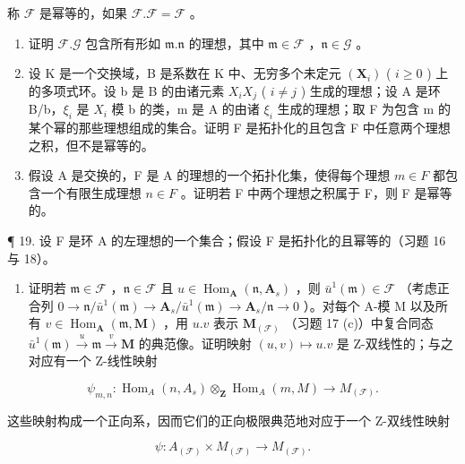 称 \(\mathcal{F}\) 是幂等的，如果 \(\mathcal{F}.\mathcal{F} = \mathcal{F}\) 。

\begin{enumerate}
\def\labelenumi{(\alph{enumi})}
\setcounter{enumi}{1}
\item
  证明 \(\mathcal{F}.\mathcal{G}\) 包含所有形如 \(\mathfrak{m}.\mathfrak{n}\) 的理想，其中 \(\mathfrak{m}\in\mathcal{F}\) ，\(\mathfrak{n}\in\mathcal{G}\) 。
\item
  设 K 是一个交换域，B 是系数在 K 中、无穷多个未定元 \((\mathbf{X}_{i})\) ( \(i \geqslant 0\) ) 上的多项式环。设 b 是 B 的由诸元素 \(X_{i}X_{j}\) ( \(i \neq j\) ) 生成的理想；设 A 是环 B/b，\(\xi_{i}\) 是 \(X_{i}\) 模 b 的类，m 是 A 的由诸 \(\xi_{i}\) 生成的理想；取 F 为包含 m 的某个幂的那些理想组成的集合。证明 F 是拓扑化的且包含 F 中任意两个理想之积，但不是幂等的。
\item
  假设 A 是交换的，F 是 A 的理想的一个拓扑化集，使得每个理想 \(m \in F\) 都包含一个有限生成理想 \(n \in F\) 。证明若 F 中两个理想之积属于 F，则 F 是幂等的。
\end{enumerate}

¶ 19. 设 F 是环 A 的左理想的一个集合；假设 F 是拓扑化的且幂等的（习题 16 与 18）。

\begin{enumerate}
\def\labelenumi{(\alph{enumi})}
\tightlist
\item
  证明若 \(\mathfrak{m} \in \mathcal{F}\) ，\(\mathfrak{n} \in \mathcal{F}\) 且 \(u \in \operatorname{Hom}_{\mathbf{A}}(\mathfrak{n}, \mathbf{A}_s)\) ，则 \(\bar{u}^1(\mathfrak{m}) \in \mathcal{F}\) （考虑正合列 \(0 \to \mathfrak{n} / \bar{u}^1(\mathfrak{m}) \to \mathbf{A}_s / \bar{u}^1(\mathfrak{m}) \to \mathbf{A}_s / \mathfrak{n} \to 0\) ）。对每个 A-模 M 以及所有 \(v \in \operatorname{Hom}_{\mathbf{A}}(\mathfrak{m}, \mathbf{M})\) ，用 \(u.v\) 表示 \(\mathbf{M}_{(\mathcal{F})}\) （习题 17 (c)）中复合同态 \(\bar{u}^1(\mathfrak{m}) \xrightarrow{u} \mathfrak{m} \xrightarrow{v} \mathbf{M}\) 的典范像。证明映射 \((u,v) \mapsto u.v\) 是 Z-双线性的；与之对应有一个 Z-线性映射
\end{enumerate}

\[
\psi_ {m, n} \colon \operatorname{Hom} _ {A} (n, A _ {s}) \otimes_ {\mathbf {Z}} \operatorname{Hom} _ {A} (m, M) \rightarrow M _ {(\mathcal {F})}.
\]

这些映射构成一个正向系，因而它们的正向极限典范地对应于一个 Z-双线性映射

\[
\psi \colon A _ {(\mathcal {F})} \times M _ {(\mathcal {F})} \rightarrow M _ {(\mathcal {F})}.
\]


